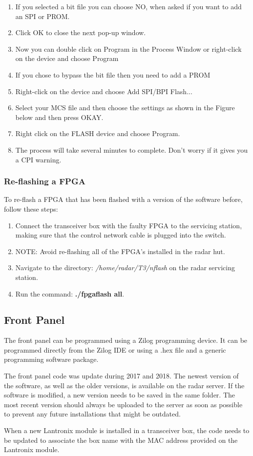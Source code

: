 \begin{enumerate}
	\item If you selected a bit file you can choose NO, when asked if you want to add an SPI or PROM.
	\item Click OK to close the next pop-up window.
	\item Now you can double click on Program in the Process Window or right-click on the device and choose Program
	\item If you chose to bypass the bit file then you need to add a PROM
	\item Right-click on the device and choose Add SPI/BPI Flash...
	\item Select your MCS file and then choose the settings as shown in the Figure below and then press OKAY.
	\item Right  click on the FLASH device and choose Program.
	\item The process will take several minutes to complete. Don’t worry if it gives you a CPI warning.
\end{enumerate}

\subsubsection{Re-flashing a FPGA}
To re-flash a FPGA that has been flashed with a version of the software before, follow these steps:
\par
\begin{enumerate}
	\item Connect the transceiver box with the faulty FPGA to the servicing station, making sure that the control network cable is plugged into the switch.
	\item NOTE: Avoid re-flashing all of the FPGA's installed in the radar hut.
	\item Navigate to the directory: \textit{/home/radar/T3/nflash} on the radar servicing station.
	\item Run the command: \textbf{./fpgaflash all}.
\end{enumerate}

\clearpage

\subsection{Front Panel}
\label{subsec:sw_fp}
The front panel can be programmed using a Zilog programming device. It can be programmed directly from the Zilog IDE or using a .hex file and a generic programming software package.
\par
The front panel code was update during 2017 and 2018. The newest version of the software, as well as the older versions, is available on the radar server. If the software is modified, a new version needs to be saved in the same folder. The most recent version should always be uploaded to the server as soon as possible to prevent any future installations that might be outdated.
\par
When a new Lantronix module is installed in a transceiver box, the code needs to be updated to associate the box name with the MAC address provided on the Lantronix module.

